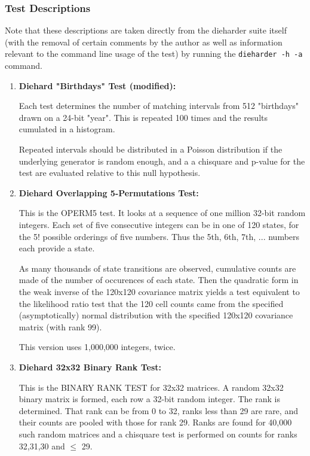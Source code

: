 \documentclass[titlepage, 11pt]{article}
\newcommand{\code}[1]
{\colorbox{light-gray}{\texttt{#1}}}
\begin{document}
\subsubsection{Test Descriptions} 
Note that these descriptions are taken directly from the dieharder suite itself (with the removal of certain comments by the author as well as information relevant to the command line usage of the test) by running the \code{dieharder -h -a} command.
\begin{enumerate}
\item {\textbf{Diehard "Birthdays" Test (modified):}}


Each test determines the number of matching intervals from 512 "birthdays" drawn on a 24-bit "year". This is repeated 100 times and the results cumulated in a histogram.


Repeated intervals should be distributed in a Poisson distribution if the underlying generator is random enough, and a a chisquare and p-value for the test are evaluated relative to this null hypothesis.


\item {\textbf{Diehard Overlapping 5-Permutations Test:}}


This is the OPERM5 test.  It looks at a sequence of one million 32-bit random integers.  Each set of five consecutive integers can be in one of 120 states, for the 5! possible orderings of five numbers. Thus the 5th, 6th, 7th, ... numbers each provide a state. 


As many thousands of state transitions are observed, cumulative counts are made of the number of occurences of each state. Then the quadratic form in the weak inverse of the 120x120 covariance matrix yields a test equivalent to the likelihood ratio test that the 120 cell counts came from the specified (asymptotically) normal distribution with the specified 120x120 covariance matrix (with rank 99).  


This version uses 1,000,000 integers, twice.


\item {\textbf{Diehard 32x32 Binary Rank Test:}} 


This is the BINARY RANK TEST for 32x32 matrices. A random 32x32 binary matrix is formed, each row a 32-bit random integer. The rank is determined. That rank can be from 0 to 32, ranks less than 29 are rare, and their counts are pooled with those for rank 29.  Ranks are found for 40,000 such random matrices and a chisquare test is performed on counts for ranks 32,31,30 and $\leq$ 29.



\end{enumerate}
\end{document}
